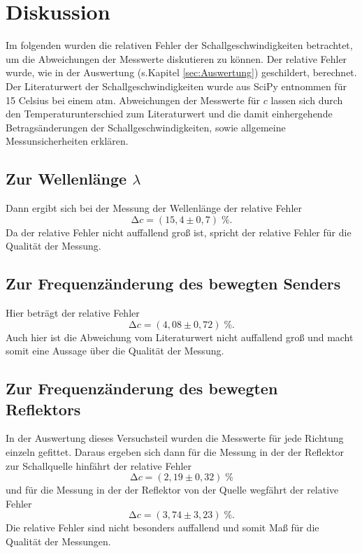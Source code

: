 \section{Diskussion}
\label{sec:Diskussion}
Im folgenden wurden die relativen Fehler der Schallgeschwindigkeiten betrachtet,
um die Abweichungen der Messwerte diskutieren zu können. Der relative Fehler wurde,
wie in der Auswertung (s.Kapitel \ref{sec:Auswertung}) geschildert, berechnet.
Der Literaturwert der
Schallgeschwindigkeiten wurde aus SciPy \cite{scipy} entnommen für 15 Celsius bei
einem atm.
Abweichungen der Messwerte für $c$ lassen sich durch
den Temperaturunterschied zum Literaturwert und die damit einhergehende
Betragsänderungen der Schallgeschwindigkeiten, sowie allgemeine Messunsicherheiten
erklären.
\subsection{Zur Wellenlänge \texorpdfstring{$\lambda$}{[math]}}
Dann ergibt sich bei der Messung der Wellenlänge der relative Fehler
\begin{equation*}
  \increment c = (15,4 \pm 0,7)\;\%.
\end{equation*}
Da der relative Fehler nicht auffallend groß ist, spricht der relative Fehler
für die Qualität der Messung.
\subsection{Zur Frequenzänderung des bewegten Senders}
Hier beträgt der relative Fehler
\begin{equation*}
    \increment c = (4,08 \pm 0,72)\;\%.
\end{equation*}
Auch hier ist die Abweichung vom Literaturwert nicht auffallend groß und macht
somit eine Aussage über die Qualität der Messung.
\subsection{Zur Frequenzänderung des bewegten Reflektors}
In der Auswertung dieses Versuchsteil wurden die Messwerte für  jede
Richtung einzeln gefittet. Daraus ergeben sich dann für die Messung in der
der Reflektor zur Schallquelle hinfährt der relative Fehler
\begin{equation*}
    \increment c = (2,19 \pm 0,32)\;\%
\end{equation*}
und für die Messung in der der Reflektor von der Quelle wegfährt der relative
Fehler
\begin{equation*}
    \increment c = (3,74 \pm 3,23)\;\%.
\end{equation*}
Die relative Fehler sind nicht besonders auffallend und somit Maß für die
Qualität der Messungen.
